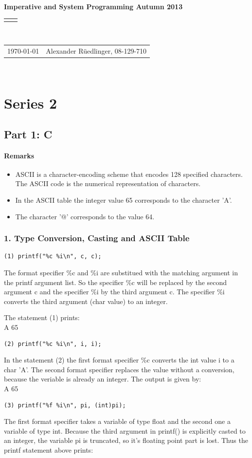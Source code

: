 \documentclass[12pt]{article}
\renewcommand{\title}[1]{\textbf{#1}\\}
\renewcommand{\line}{\begin{tabularx}{\textwidth}{X>{\raggedleft}X}\hline\\\end{tabularx}\\[-0.5cm]}
\newcommand{\leftright}[2]{\begin{tabularx}{\textwidth}{X>{\raggedleft}X}#1%
& #2\\\end{tabularx}\\[-0.5cm]}
\begin{document}
\title{Imperative and System Programming Autumn 2013}
\line
\leftright{\today}{Alexander Rüedlinger, 08-129-710} %
\section*{Series 2}
\subsection*{Part 1: C}
\paragraph{Remarks}
\begin{itemize}[noitemsep]
\item ASCII is a character-encoding scheme that encodes 128 specified characters. The ASCII code is the numerical representation of characters.
\item In the ASCII table the integer value 65 corresponds to the character 'A'.
\item The character '@' corresponds to the value 64.
\end{itemize}

\subsubsection*{1. Type Conversion, Casting and ASCII Table}
\begin{lstlisting}
(1) printf("%c %i\n", c, c);
\end{lstlisting}

The format specifier \%c and \%i are substitued with the matching argument in the printf argument list. 
So the specifier \%c will be replaced by the second argument c and the specifier \%i by the third argument c. The specifier \%i converts the third argument (char value) to an integer.

The statement (1) prints:\\
A 65
\\
\begin{lstlisting}
(2) printf("%c %i\n", i, i);
\end{lstlisting}
In the statement (2) the first format specifier \%c converts the int value i to a char 'A'. The second format specifier replaces the value without a conversion, because the veriable is already an integer.
The output is given by:\\
A 65
\\
\begin{lstlisting}
(3) printf("%f %i\n", pi, (int)pi);
\end{lstlisting}
The first format specifier takes a variable of type float and the second one a variable of type int.
Because the third argument in printf() is explicitly casted to an integer, the variable pi is truncated, so it's floating point part is lost. Thus the printf statement above prints:
\end{document}
